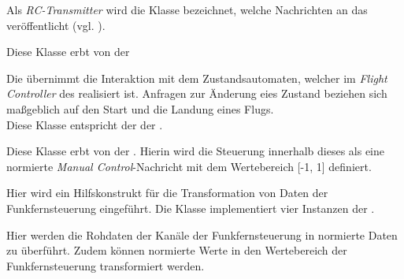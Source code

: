 Als \textit{RC-Transmitter} wird die Klasse bezeichnet, welche Nachrichten an das  veröffentlicht (vgl. ).

Diese Klasse erbt von der 


Die  übernimmt die Interaktion mit dem Zustandsautomaten, welcher im \textit{Flight Controller} des \Quad[s] realisiert ist.
Anfragen zur Änderung eies Zustand beziehen sich maßgeblich auf den Start und die Landung eines Flugs.
\\Diese Klasse entspricht der  der \Ar.


Diese Klasse erbt von der . Hierin wird die Steuerung innerhalb dieses \Pack[s] als eine normierte \textit{Manual Control}-Nachricht mit dem Wertebereich [-1, 1] definiert.


Hier wird ein Hilfskonstrukt für die Transformation von Daten der Funkfernsteuerung eingeführt. Die Klasse implementiert vier Instanzen der .


Hier werden die Rohdaten der Kanäle der Funkfernsteuerung in normierte Daten zu überführt. Zudem können normierte Werte in den Wertebereich der Funkfernsteuerung transformiert werden.


